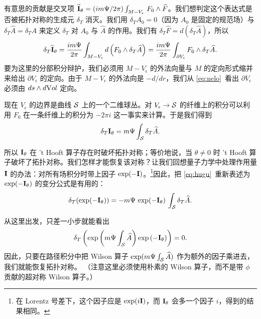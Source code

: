 有意思的贡献是交叉项 $\tilde {{\cmmib I}}_\theta =(im\Psi/2\pi)\int_{M-V_\epsilon}\,F_0\wedge \hat F$。我们想判定这个表达式是否被拓扑对称的生成元 $\delta_T$ 消灭。我们用 $\delta_T A_0=0$（因为 $A_0$ 是固定的规范场）与 $\delta_T\hat A=\delta_TA$ 来定义 $\delta_T$ 对 $A_0$ 与 $\hat A$ 的作用。我们有 $\delta_T \hat F=d (\delta_T\hat A)$，所以
\setcounter{equation}{12}
\begin{equation}\label{eq:juqu}
\delta_T\tilde {{\cmmib I}}_\theta={im\Psi\over
2\pi}\int_{M-V_{\epsilon}}d\left(F_0\wedge \delta_T\hat
A\right)={im\Psi\over 2\pi}\int_{\partial V_\epsilon} F_0\wedge
\delta_T\hat A.
\end{equation}
 要为这里的分部积分辩护，我们必须用 $M-V_\epsilon$ 的外法向量与 $M$ 的定向形式缩并来给出 $\partial V_\epsilon$ 的定向。由于 $M-V_\epsilon$ 的外法向是 $-d/dr$，我们从 \eqref{eq:nelo}\ 看出 $\partial V_\epsilon$ 必须由 $ds\wedge d{\rm Vol}$ 定向。

现在 $V_\epsilon$ 的边界是曲线 ${{\cal S}}$ 上的一个二维球丛。对 $V_\epsilon\to {{\cal S}}$ 的纤维上的积分可以利用 $F_0$ 在一条纤维上的积分为 $-2\pi i$ 这一事实来计算。于是我们得到
\setcounter{equation}{13}
\begin{equation}\label{eq:hugu}
\delta_T {{\cmmib I}}_\theta=m\Psi \int_{{\cal
S}}\delta_T \hat A.
\end{equation}

所以 ${{\cmmib I}}_\theta$ 在 't Hooft 算子存在时破坏拓扑对称；等价地说，当 $\theta\not= 0$ 时 't Hooft 算子破坏了拓扑对称。我们怎样才能恢复该对称？让我们回想量子力学中处理作用量 ${{\cmmib I}}$ 的办法：对所有场积分时带上因子 $\exp(-{{\cmmib I}})$。\footnote{在 Lorentz 号差下，这个因子应是 $\exp(i{{\cmmib I}})$，而 ${{{\cmmib I}}}_\theta$ 会多一个因子 $i$，得到的结果相同。}因此，把 \eqref{eq:hugu}\ 重新表述为 $\exp(-{{\cmmib I}}_\theta)$ 的变分公式是有用的：
\setcounter{equation}{14}
\begin{equation}\label{eq:jugu}
\delta_T(\exp(-{{\cmmib
I}}_\theta))=-m\Psi\,\exp(-{{\cmmib I}}_\theta)\, \int_{{\cal S}}
\delta_T\hat A.
\end{equation}

{}从这里出发，只差一小步就能看出
\setcounter{equation}{15}
\begin{equation}\label{eq:flugu}
\delta_T\left(\exp\left(m\Psi\int_{{\cal S}} \hat
A\right)\exp\left(-{{\cmmib I}}_\theta\right)\right)=0.
\end{equation}
 因此，只要在路径积分中把 Wilson 算子 $\exp(m\Psi\int_{{\cal S}} \hat A)$ 作为额外的因子乘进去，我们就能恢复拓扑对称。 （注意这里必须使用朴素的 Wilson 算子，而不是带 $\phi$ 贡献的超对称 Wilson 算子。）

